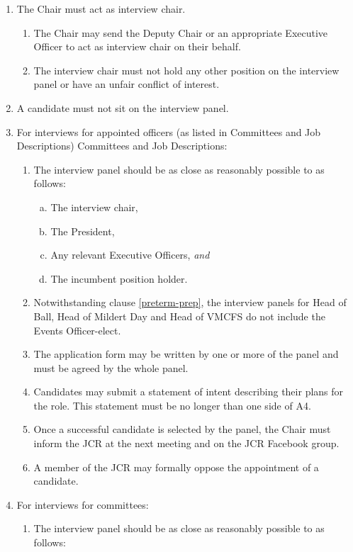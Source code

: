 \documentclass[12pt]{article}
\begin{document}
\begin{enumerate}
    \item The Chair must act as interview chair.
    \begin{enumerate}
        \item The Chair may send the Deputy Chair or an appropriate Executive Officer to act as interview chair on their behalf.
        \item The interview chair must not hold any other position on the interview panel or have an unfair conflict of interest.
    \end{enumerate}
    \item A candidate must not sit on the interview panel.
    \item For interviews for appointed officers (as listed in Committees and Job Descriptions) Committees and Job Descriptions:
    \begin{enumerate}
        \item The interview panel should be as close as reasonably possible to as follows:
        \begin{enumerate}[(a)]
            \item The interview chair,
            \item The President,
            \item Any relevant Executive Officers, \emph{and}
            \item The incumbent position holder.
        \end{enumerate}
        \item Notwithstanding clause \ref{preterm-prep}, the interview panels for Head of Ball, Head of Mildert Day and Head of VMCFS do not include the Events Officer-elect.
        \item The application form may be written by one or more of the panel and must be agreed by the whole panel.
        \item Candidates may submit a statement of intent describing their plans for the role. This statement must be no longer than one side of A4.
        \item Once a successful candidate is selected by the panel, the Chair must inform the JCR at the next meeting and on the JCR Facebook group.
        \item A member of the JCR may formally oppose the appointment of a candidate.
    \end{enumerate}
    \item For interviews for committees:
    \begin{enumerate}
        \item The interview panel should be as close as reasonably possible to as follows:

\end{enumerate}
\end{enumerate}
\end{document}

